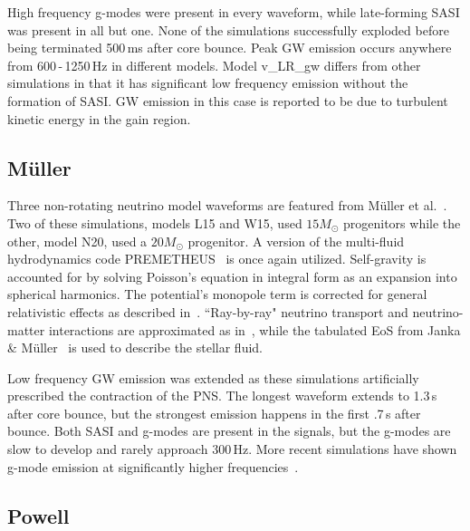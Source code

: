 High frequency g-modes were present in every waveform, while late-forming SASI was present in all but one. None of the simulations successfully exploded before being terminated 500\,ms after core bounce. Peak GW emission occurs anywhere from 600\,-\,1250\,Hz in different models. Model v\_LR\_gw differs from other simulations in that it has significant low frequency emission without the formation of SASI. GW emission in this case is reported to be due to turbulent kinetic energy in the gain region.

\subsection{M\"uller}

Three non-rotating neutrino model waveforms are featured from M\"uller et al.~\cite{mueller:e12}. Two of these simulations, models L15 and W15, used $15M_\odot$ progenitors while the other, model N20, used a $20M_\odot$ progenitor. A version of the multi-fluid hydrodynamics code PREMETHEUS~\cite{muller1991instability, fryxell1991instabilities} is once again utilized. Self-gravity is accounted for by solving Poisson's equation in integral form as an expansion into spherical harmonics. The potential's monopole term is corrected for general relativistic effects as described in~\cite{scheck2006multidimensional, arcones2007nucleosynthesis}. ``Ray-by-ray" neutrino transport and neutrino-matter interactions are approximated as in~\cite{scheck2006multidimensional}, while the tabulated EoS from Janka \& M\"uller~\cite{janka1996neutrino} is used to describe the stellar fluid.

Low frequency GW emission was extended as these simulations artificially prescribed the contraction of the PNS. The longest waveform extends to 1.3\,s after core bounce, but the strongest emission happens in the first .7\,s after bounce. Both SASI and g-modes are present in the signals, but the g-modes are slow to develop and rarely approach 300\,Hz. More recent simulations have shown g-mode emission at significantly higher frequencies~\cite{andresen:16, kuroda:16}.

\subsection{Powell}

